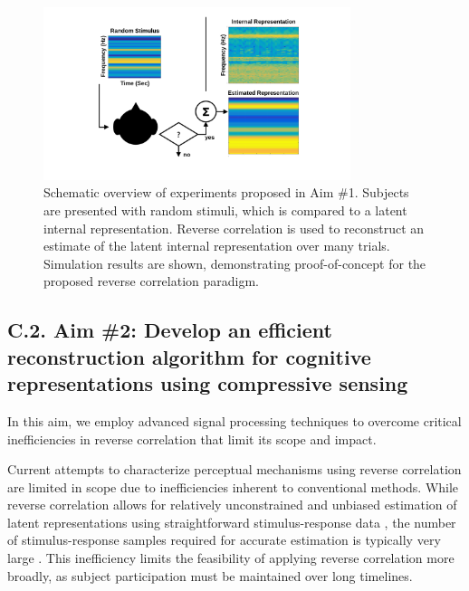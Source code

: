 \documentclass[11pt, notitlepage]{article} %
\begin{document}
\begin{figure}[h] %
	\centering
	\includegraphics[width=0.8\textwidth]{Figures/Figures_tinnitus_3.png}
	\caption{Schematic overview of experiments proposed in Aim \#1.
	Subjects are presented with random stimuli,
	which is compared to a latent internal representation.
	Reverse correlation is used to reconstruct an estimate of the latent internal representation
	over many trials.
	Simulation results are shown, demonstrating proof-of-concept
	for the proposed reverse correlation paradigm.}
	\label{fig:experiment}
\end{figure}

\subsection*{C.2. Aim \#2: Develop an efficient reconstruction algorithm for cognitive representations using compressive sensing}

In this aim, we employ advanced signal processing techniques to overcome critical inefficiencies
in reverse correlation that limit its scope and impact.

Current attempts to characterize perceptual mechanisms using reverse correlation
are limited in scope due to inefficiencies inherent to conventional methods.
While reverse correlation allows for relatively unconstrained and unbiased
estimation of latent representations using straightforward stimulus-response data
\cite{marmarelisWhiteNoiseMethodSystem1978,nishimotoReceptiveFieldProperties2006},
the number of stimulus-response samples required for accurate estimation
is typically very large \cite{mineaultImprovedClassificationImages2009}.
This inefficiency limits the feasibility of applying reverse correlation more broadly,
as subject participation must be maintained over long timelines.
\end{document}
